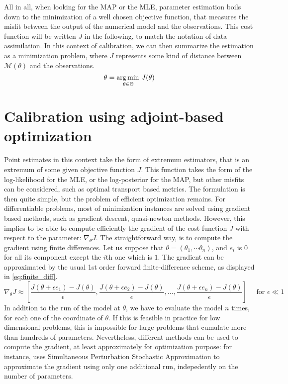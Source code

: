 \documentclass[../../Main_ManuscritThese.tex]{subfiles}
\begin{document}
All in all, when looking for the MAP or the MLE, parameter estimation boils down to the minimization of a well chosen objective function, that measures the misfit between the output of the numerical model and the observations. This cost function will be written $J$ in the following, to match the notation of data assimilation. 
In this context of calibration, we can then summarize the estimation as a minimization problem, where $J$ represents some kind of distance between $\mathcal{M}(\theta)$ and the observations.
\begin{equation}
  {\theta}_{\mathrm{}} = \operatorname*{arg\,min \,}_{\theta\in \Theta} J(\theta)
\end{equation}

\section{Calibration using adjoint-based optimization}
\label{sec:calibration_adjoint_optimization}
Point estimates in this context take the form of extremum estimators, that is an extremum of some given objective function $J$. This function takes the form of the log-likelihood for the MLE, or the log-posterior for the MAP, but other misfits can be considered, such as optimal transport based metrics. The formulation is then quite simple, but the problem of efficient optimization remains. For differentiable problems, most of minimization instances are solved using gradient based methods, such as gradient descent, quasi-newton methods.
However, this implies to be able to compute efficiently the gradient of the cost function $J$ with respect to the parameter: $\nabla_{\theta} J$. The straightforward way, is to compute the gradient using finite differences. Let us suppose that $\theta = (\theta_1,\cdots \theta_n)$, and $e_i$ is 0 for all its component except the $i$th one which is $1$. The gradient can be approximated by the usual 1st order forward finite-difference scheme, as displayed in \cref{eq:finite_diff}.
\begin{equation}
  \label{eq:finite_diff}
  \nabla_{\theta} J  \approx \left[\frac{J(\theta + \epsilon e_1) - J(\theta)}{\epsilon}, \frac{J(\theta + \epsilon e_2) - J(\theta)}{ \epsilon},\dots, \frac{J(\theta + \epsilon e_n)- J(\theta)}{\epsilon} \right] \quad \text{ for } \epsilon \ll 1
\end{equation}
In addition to the run of the model at $\theta$, we have to evaluate the model $n$ times, for each one of the coordinate of $\theta$. If this is feasible in practice for low dimensional problems, this is impossible for large problems that cumulate more than hundreds of parameters. Nevertheless, different methods can be used to compute the gradient, at least approximately for optimization purpose: for instance, \cite{boutet_estimation_2015} uses Simultaneous Perturbation Stochastic Approximation to approximate the gradient using only one additional run, indepedently on the number of parameters.
\end{document}
